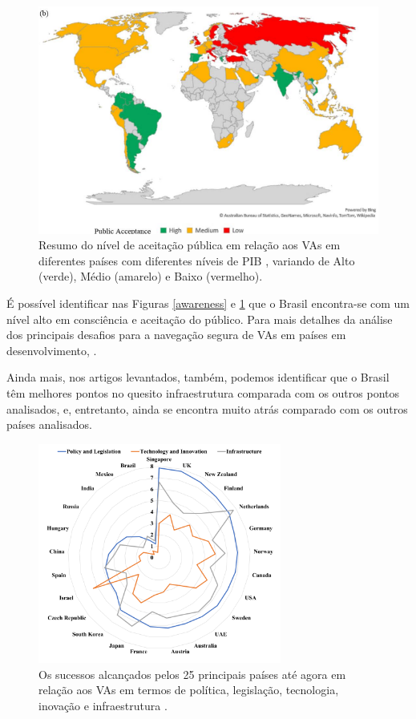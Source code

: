 \begin{figure}[H]
\centering
\includegraphics[width=12cm]{Figures/grafik-b.png}
\caption{Resumo do nível de aceitação pública em relação aos VAs em diferentes países com diferentes níveis de PIB \cite{mundobrasil}, variando de Alto (verde), Médio (amarelo) e Baixo (vermelho).}
\label{public}
\end{figure}

É possível identificar nas Figuras \ref{awareness} e \ref{public} que o Brasil encontra-se com um nível alto em consciência e aceitação do público. Para mais detalhes da análise dos principais desafios para a navegação segura de VAs em países em desenvolvimento, \cite{mundobrasil}.

Ainda mais, nos artigos levantados, também, podemos identificar que o Brasil têm melhores pontos no quesito infraestrutura comparada com os outros pontos analisados, e, entretanto, ainda se encontra muito atrás comparado com os outros países analisados.

\begin{figure}[H]
\centering
\includegraphics[width=8cm]{Figures/future.png}
\caption{Os sucessos alcançados pelos 25 principais países até agora em relação aos VAs em termos de política, legislação, tecnologia, inovação e infraestrutura \cite{future-view}.}
\label{figura_future-view}
\end{figure}



